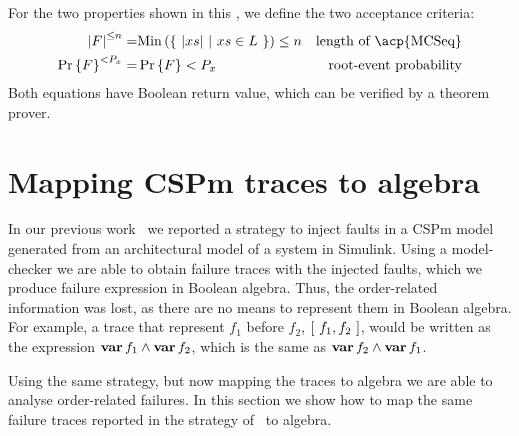 \documentclass[12pt,openright,twoside,a4paper,oldfontcommands,english,brazil,final]{abntex2}
\theoremstyle{theo}
\newcommand{\simulink}{Simulink\xspace}
\def\varop{\ensuremath\operatorname{\mathbf{var}}}
\newcommand{\var}[1]{\ensuremath\varop #1}
\newcommand{\length}[1]{\ensuremath\left|#1\right|}
\newcommand{\trace}[1]{\ensuremath\left[~#1~\right]}
\def\probabilityop{\ensuremath \Pr}
\newcommand{\probability}[1]{\ensuremath \probabilityop\left\{#1\right\}}
\def\Minop{\ensuremath\mathrm{Min}}
\newcommand{\Min}[1]{\ensuremath\Minop\left(#1\right)}
\newcommand{\lengthacceptance}[2]{\ensuremath\length{#1}^{\le#2}}
\newcommand{\probacceptance}[2]{\ensuremath\probability{#1}^{<#2}}
\begin{document}
For the two properties shown in this , we define the two acceptance criteria:
%
\begin{subequations}
\begin{align}
\lengthacceptance{F}{n} = & \Min{\left\{~ \length{xs} ~\middle|~ xs \in L ~\right\}} \le n & \text{length of \acp{MCSeq}}\\
%
\probacceptance{F}{P_x} = & \probability{F} < P_x & \text{root-event probability}
\end{align}
\end{subequations}
%
Both equations have Boolean return value, which can be verified by a theorem prover.

\section{Mapping \ac*{CSPm} traces to \ac*{algebra}}
\label{sec:mapping-cspm-algebra}

In our previous work~\cite{DM2012,Didier2012} we reported a strategy to inject faults in a \ac{CSPm} model generated from an architectural model of a system in \simulink.
Using a model-checker we are able to obtain failure traces with the injected faults, which we produce failure expression in Boolean algebra.
Thus, the order-related information was lost, as there are no means to represent them in Boolean algebra.
For example, a trace that represent $f_1$ before $f_2$, $\trace{f_1,f_2}$, would be written as the expression $\var{f_1} \land \var{f_2}$, which is the same as $\var{f_2} \land \var{f_1}$.

Using the same strategy, but now mapping the traces to \ac{algebra} we are able to analyse order-related failures.
In this section we show how to map the same failure traces reported in the strategy of~\cite{DM2012} to \ac{algebra}.
\end{document}
